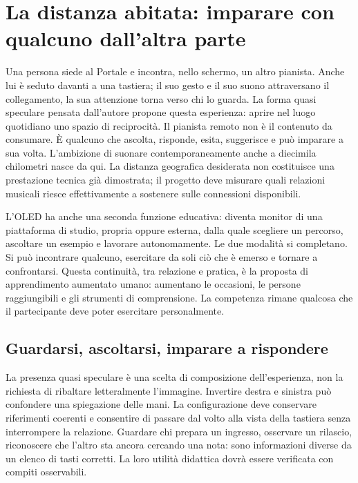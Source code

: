 \chapter{La distanza abitata: imparare con qualcuno dall'altra parte}\label{sec:learning}

Una persona siede al Portale e incontra, nello schermo, un altro pianista.
Anche lui è seduto davanti a una tastiera; il suo gesto e il suo suono attraversano il collegamento, la sua attenzione torna verso chi lo guarda. La forma quasi speculare
pensata dall'autore propone questa esperienza: aprire nel luogo quotidiano
uno spazio di reciprocità. Il pianista remoto non è il contenuto da consumare.
È qualcuno che ascolta, risponde, esita, suggerisce e può imparare a sua volta.
L'ambizione di suonare contemporaneamente anche a diecimila chilometri nasce
da qui. La distanza geografica desiderata non costituisce una prestazione
tecnica già dimostrata; il progetto deve misurare quali relazioni musicali
riesce effettivamente a sostenere sulle connessioni disponibili.

L'OLED ha anche una seconda funzione educativa: diventa monitor di una
piattaforma di studio, propria oppure esterna, dalla quale scegliere un
percorso, ascoltare un esempio e lavorare autonomamente. Le due modalità
si completano. Si può incontrare qualcuno, esercitare da soli ciò che è
emerso e tornare a confrontarsi. Questa continuità, tra relazione e pratica,
è la proposta di apprendimento aumentato umano: aumentano le occasioni,
le persone raggiungibili e gli strumenti di comprensione. La competenza
rimane qualcosa che il partecipante deve poter esercitare personalmente.

\section{Guardarsi, ascoltarsi, imparare a rispondere}

La presenza quasi speculare è una scelta di composizione dell'esperienza,
non la richiesta di ribaltare letteralmente l'immagine. Invertire destra e
sinistra può confondere una spiegazione delle mani. La configurazione deve
conservare riferimenti coerenti e consentire di passare dal volto alla
vista della tastiera senza interrompere la relazione. Guardare chi prepara
un ingresso, osservare un rilascio, riconoscere che l'altro sta ancora
cercando una nota: sono informazioni diverse da un elenco di tasti corretti.
La loro utilità didattica dovrà essere verificata con compiti osservabili.

